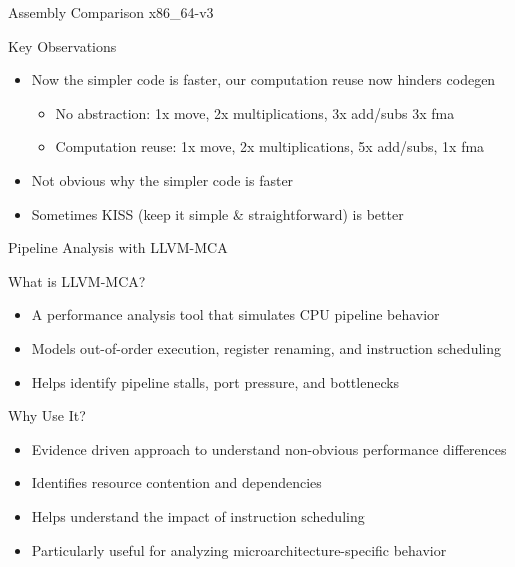 \documentclass{beamer}
\begin{document}
\begin{frame}{Assembly Comparison x86\_64-v3}
    \begin{block}{Key Observations}
        \begin{itemize}
            \item Now the simpler code is faster, our computation reuse now hinders codegen
            \begin{itemize}
                \item No abstraction: 1x move, 2x multiplications, 3x add/subs 3x fma
                \item Computation reuse: 1x move, 2x multiplications, 5x add/subs, 1x fma
            \end{itemize}
            \item Not obvious why the simpler code is faster
            \item Sometimes KISS (keep it simple \& straightforward) is better
        \end{itemize}
    \end{block}
\end{frame}

\begin{frame}{Pipeline Analysis with LLVM-MCA}
    \begin{block}{What is LLVM-MCA?}
        \begin{itemize}
            \item A performance analysis tool that simulates CPU pipeline behavior
            \item Models out-of-order execution, register renaming, and instruction scheduling
            \item Helps identify pipeline stalls, port pressure, and bottlenecks
        \end{itemize}
    \end{block}
    
    \begin{exampleblock}{Why Use It?}
        \begin{itemize}
            \item Evidence driven approach to understand non-obvious performance differences
            \item Identifies resource contention and dependencies
            \item Helps understand the impact of instruction scheduling
            \item Particularly useful for analyzing microarchitecture-specific behavior
        \end{itemize}
    \end{exampleblock}
\end{frame}
\end{document}

